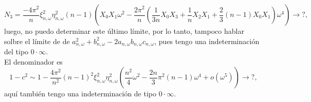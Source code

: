 \[
N_{3} =
\frac{-4 \pi^{2}}{n}
\xi_{n, \omega}^{2} \eta_{n, \omega}^{2}(n-1)
\left(
X_{0}X_{1}\omega^{2} 
- \frac{2 \pi^{2}}{n}
\left(
\frac{1}{3n} X_{0}X_{3} + \frac{1}{n} X_{2}X_{1}
+ \frac{2}{3}(n-1)X_{0}X_{1}
\right) \omega^{4}
\right)
\rightarrow ?,
\]
luego, no puedo determinar este último límite, por lo tanto,
tampoco hablar solbre el límite de
de $a_{n, \omega}^{2} + b_{n, \omega}^{2} - 
2a_{n, \omega}b_{n, \omega}c_{n, \omega}$, pues
tengo una indeterminación del tipo 
$0 \cdot \infty$. \\

El denominador es
\[
1-c^{2} \sim
1 - \frac{4\pi^{2}}{n^{2}}(n-1)^{2} \xi_{n, \omega}^{2} \eta_{n, \omega}^{2}
\left(
\frac{n^{2}}{4} \omega^{2} - \frac{2n}{3} \pi^{2} (n-1) \omega^{4} + o(\omega^{5})
\right) \rightarrow ?,
\]
aquí también tengo una indeterminación de tipo
$0 \cdot \infty$.